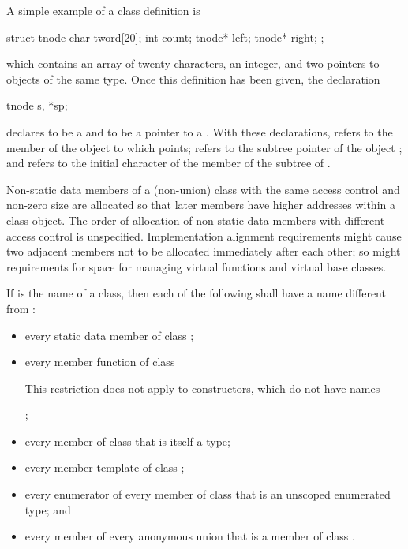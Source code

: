 \pnum
\begin{example}
A simple example of a class definition is
\begin{codeblock}
struct tnode {
  char tword[20];
  int count;
  tnode* left;
  tnode* right;
};
\end{codeblock}
which contains an array of twenty characters, an integer, and two
pointers to objects of the same type. Once this definition has been
given, the declaration
\begin{codeblock}
tnode s, *sp;
\end{codeblock}
declares  to be a  and  to be a pointer
to a . With these declarations,  refers to
the  member of the object to which  points;
 refers to the  subtree pointer of the object
; and  refers to the initial character
of the  member of the  subtree of .
\end{example}

\pnum
\begin{note}
%
Non-static data members of a (non-union) class
with the same access control and
non-zero size
are allocated so that later
members have higher addresses within a class object.
%
The order of allocation of non-static data members
with different access control
is unspecified.
Implementation alignment requirements might cause two adjacent members
not to be allocated immediately after each other; so might requirements
for space for managing virtual functions and
virtual base classes.
\end{note}

\pnum
If  is the name of a class, then each of the following shall
have a name different from :
\begin{itemize}
\item every static data member of class ;

\item every member function of class 
\begin{note}
This restriction does not apply to constructors, which do not have
names
\end{note}%
;

\item every member of class  that is itself a type;

\item every member template of class ;

\item every enumerator of every member of class  that is an
unscoped enumerated type; and

\item every member of every anonymous union that is a member of class
.
\end{itemize}

